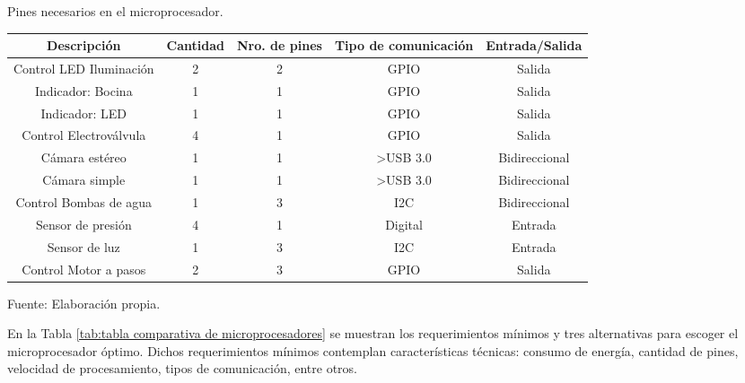 \begin{mytable}[H]
	\footnotesize\centering
	\caption{Pines necesarios en el microprocesador.}
	\label{tab:pines necesarios en el microprocesador}
	\begin{tabular}{|c|c|c|c|c|}
		\hline
		\textbf{Descripción} & \textbf{Cantidad} & \textbf{Nro. de pines} & \textbf{Tipo de comunicación} & \textbf{Entrada/Salida} \\ \hline
		Control LED Iluminación   & 2 & 2 & GPIO                  & Salida        \\ \hline
		Indicador: Bocina         & 1 & 1 & GPIO                  & Salida        \\ \hline
		Indicador: LED            & 1 & 1 & GPIO                  & Salida        \\ \hline
		Control Electroválvula    & 4 & 1 & GPIO                  & Salida        \\ \hline
		Cámara estéreo            & 1 & 1 & \textgreater{}USB 3.0 & Bidireccional \\ \hline
		Cámara simple             & 1 & 1 & \textgreater{}USB 3.0 & Bidireccional \\ \hline
		Control Bombas de agua    & 1 & 3 & I2C                   & Bidireccional \\ \hline
		Sensor de presión         & 4 & 1 & Digital               & Entrada       \\ \hline
		Sensor de luz     & 1 & 3 & I2C                   & Entrada        \\ \hline
		Control Motor a pasos     & 2 & 3 & GPIO                  & Salida        \\ \hline
	\end{tabular}
	\begin{myflushcenteraftertable}	
		Fuente: Elaboración propia.
	\end{myflushcenteraftertable}
\end{mytable}

En la Tabla \ref{tab:tabla comparativa de microprocesadores} se muestran los requerimientos mínimos y tres alternativas para escoger el microprocesador óptimo. Dichos requerimientos mínimos contemplan características técnicas: consumo de energía, cantidad de pines, velocidad de procesamiento, tipos de comunicación, entre otros.


